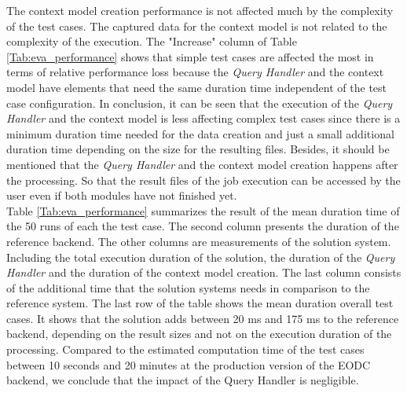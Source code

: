 \documentclass[draft,final]{vutinfth} %
\begin{document}
The context model creation performance is not affected much by the complexity of the test cases. The captured data for the context model is not related to the complexity of the execution. The "Increase" column of Table \ref{Tab:eva_performance} shows that simple test cases are affected the most in terms of relative performance loss because the \textit{Query Handler} and the context model have elements that need the same duration time independent of the test case configuration. In conclusion, it can be seen that the execution of the \textit{Query Handler} and the context model is less affecting complex test cases since there is a minimum duration time needed for the data creation and just a small additional duration time depending on the size for the resulting files. Besides, it should be mentioned that the \textit{Query Handler} and the context model creation happens after the processing. So that the result files of the job execution can be accessed by the user even if both modules have not finished yet. \\
Table \ref{Tab:eva_performance} summarizes the result of the mean duration time of the 50 runs of each the test case. The second column presents the duration of the reference backend. The other columns are measurements of the solution system. Including the total execution duration of the solution, the duration of the \textit{Query Handler} and the duration of the context model creation. The last column consists of the additional time that the solution systems needs in comparison to the reference system. The last row of the table shows the mean duration overall test cases. It shows that the solution adds between 20 ms and 175 ms to the reference backend, depending on the result sizes and not on the execution duration of the processing. Compared to the estimated computation time of the test cases between 10 seconds and 20 minutes at the production version of the EODC backend, we conclude that the impact of the Query Handler is negligible.
\end{document}
